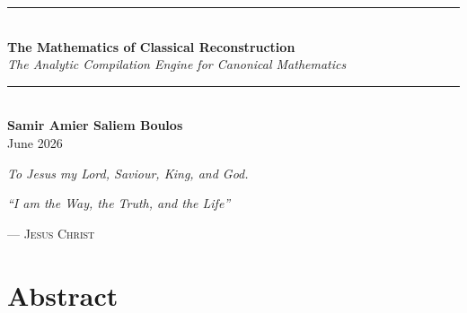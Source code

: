 \documentclass[12pt,openany]{extbook}
\theoremstyle{plain}
\theoremstyle{definition}
\begin{document}
\begin{titlepage}
    \centering
    \vspace*{\fill} 

    \noindent\rule{\textwidth}{1pt} \\[1.5em]

    {\Huge \textbf{The Mathematics of Classical Reconstruction}} \\[1.5em]

    {\Large \textit{The Analytic Compilation Engine for Canonical Mathematics}} \\[1.2em]

    \noindent\rule{\textwidth}{1pt} \\[3cm]

    {\Large \textbf{Samir Amier Saliem Boulos}} \\
    \vspace{1cm}
    {\large June 2026}

    \vspace*{\fill} 
\end{titlepage}


\frontmatter

\cleardoublepage
\thispagestyle{empty}
\vspace*{0.3\textheight}
\begin{center}
    {\Huge\itshape \textit{To Jesus my Lord, Saviour, King, and God.}}
\end{center}
\clearpage

\cleardoublepage
\thispagestyle{empty}
\vspace*{0.3\textheight}
\begin{flushright}
    \begin{minipage}{0.7\textwidth}
        \raggedleft
        \Large\itshape
        ``I am the Way, the Truth, and the Life''
        
        \vspace{0.5em}
        \normalsize\normalfont\textsc{— Jesus Christ}
    \end{minipage}
\end{flushright}
\clearpage


\tableofcontents

\chapter*{Abstract}
\end{document}
